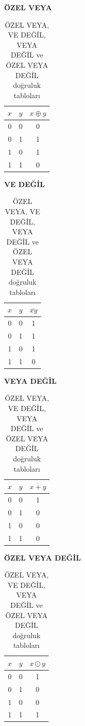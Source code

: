 \begin{table}[H]
\centering
\caption{ÖZEL VEYA, VE DEĞİL, VEYA DEĞİL ve ÖZEL VEYA DEĞİL doğruluk tabloları}
\label{tab:B.6}
\begin{minipage}{0.22\textwidth}
\centering
\textbf{ÖZEL VEYA}
\vspace{0.3em}

\begin{tabular}{cc|c}
\toprule
$x$ & $y$ & $x \oplus y$ \\
\midrule
0 & 0 & 0 \\
0 & 1 & 1 \\
1 & 0 & 1 \\
1 & 1 & 0 \\
\bottomrule
\end{tabular}
\end{minipage}
\hfill
\begin{minipage}{0.22\textwidth}
\centering
\textbf{VE DEĞİL}
\vspace{0.3em}

\begin{tabular}{cc|c}
\toprule
$x$ & $y$ & $\overline{xy}$ \\
\midrule
0 & 0 & 1 \\
0 & 1 & 1 \\
1 & 0 & 1 \\
1 & 1 & 0 \\
\bottomrule
\end{tabular}
\end{minipage}
\hfill
\begin{minipage}{0.22\textwidth}
\centering
\textbf{VEYA DEĞİL}
\vspace{0.3em}

\begin{tabular}{cc|c}
\toprule
$x$ & $y$ & $\overline{x+y}$ \\
\midrule
0 & 0 & 1 \\
0 & 1 & 0 \\
1 & 0 & 0 \\
1 & 1 & 0 \\
\bottomrule
\end{tabular}
\end{minipage}
\hfill
\begin{minipage}{0.22\textwidth}
\centering
\textbf{ÖZEL VEYA DEĞİL}
\vspace{0.3em}

\begin{tabular}{cc|c}
\toprule
$x$ & $y$ & $x \odot y$ \\
\midrule
0 & 0 & 1 \\
0 & 1 & 0 \\
1 & 0 & 0 \\
1 & 1 & 1 \\
\bottomrule
\end{tabular}
\end{minipage}
\end{table}


